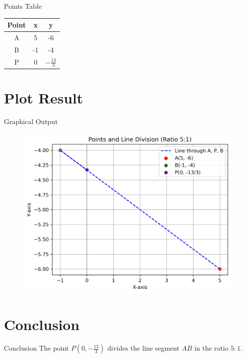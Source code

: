\documentclass{beamer}
\begin{document}
\begin{frame}{Points Table}
\centering
\begin{tabular}{|c|c|c|}
\hline
Point & x & y \\
\hline
A & 5 & -6 \\
B & -1 & -4 \\
P & 0 & $-\tfrac{13}{3}$ \\
\hline
\end{tabular}
\end{frame}

\section{Plot Result}
\begin{frame}{Graphical Output}
 \begin{figure}[H]
     \centering
     \includegraphics[width=0.5\columnwidth]{figs/fig1.png}
     \caption{}
     \label{fig:fig1}
 \end{figure}
\end{frame}

\section{Conclusion}
\begin{frame}{Conclusion}
  The point $P(0,-\tfrac{13}{3})$ divides the line segment $AB$ in the ratio $5:1$.
\end{frame}
\end{document}

